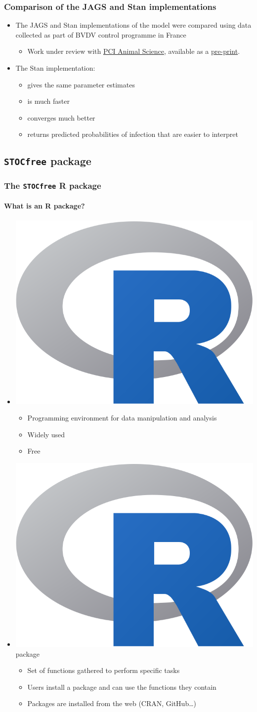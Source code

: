 \documentclass{beamer}
\begin{document}
\begin{frame}
\frametitle{Comparison of the JAGS and Stan implementations}
\begin{itemize}
 \item{The JAGS and Stan implementations of the model were compared using data collected as part of BVDV control programme in France}
 \begin{itemize}
  \item{Work under review with \href{https://animsci.peercommunityin.org/}{PCI Animal Science}, available as a \href{https://www.biorxiv.org/content/10.1101/2020.07.10.197426v4.full}{pre-print}.}
 \end{itemize}
 \item{The Stan implementation:}
 \begin{itemize}
  \item{gives the same parameter estimates}
  \item{is much faster}
  \item{converges much better}
  \item{returns predicted probabilities of infection that are easier to interpret}
 \end{itemize}
\end{itemize}
\end{frame}

\subsection{\texttt{STOCfree} package}

\begin{frame}
\frametitle{The \texttt{STOCfree} R package}
\framesubtitle{What is an R package?}
\begin{itemize}
\item[]{\includegraphics[width=.07\textwidth]{imgs/Rlogo.png}}
\begin{itemize}
 \item{Programming environment for data manipulation and analysis}
 \item{Widely used}
 \item{Free}
\end{itemize}
\item[]{\includegraphics[width=.07\textwidth]{imgs/Rlogo.png} package}
 \begin{itemize}
  \item{Set of functions gathered to perform specific tasks}
  \item{Users install a package and can use the functions they contain}
  \item{Packages are installed from the web (CRAN, GitHub…)}
 \end{itemize}
\end{itemize}
\end{frame}
\end{document}
